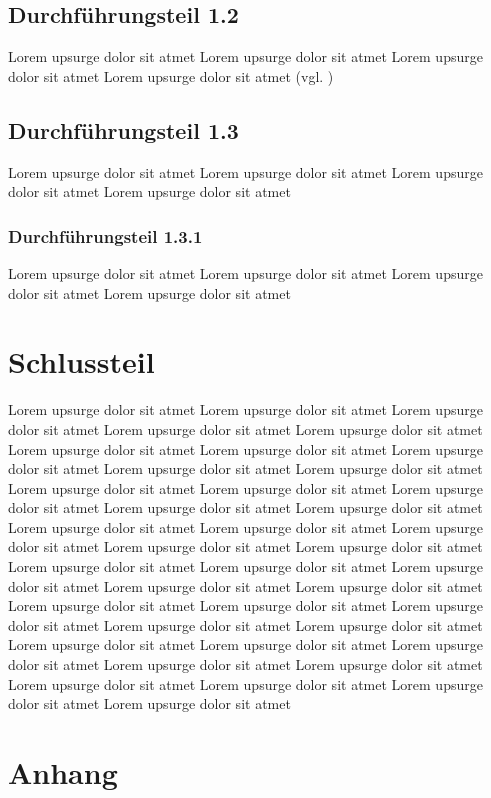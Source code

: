 \documentclass[12pt, a4paper]{article}
\begin{document}
\subsection{Durchführungsteil 1.2}
Lorem upsurge dolor sit atmet Lorem upsurge dolor sit atmet Lorem upsurge dolor sit atmet Lorem upsurge dolor sit atmet (vgl. \cite{samplebook})
\subsection{Durchführungsteil 1.3}
Lorem upsurge dolor sit atmet Lorem upsurge dolor sit atmet Lorem upsurge dolor sit atmet Lorem upsurge dolor sit atmet
\subsubsection{Durchführungsteil 1.3.1}
Lorem upsurge dolor sit atmet Lorem upsurge dolor sit atmet Lorem upsurge dolor sit atmet Lorem upsurge dolor sit atmet

\section{Schlussteil}

Lorem upsurge dolor sit atmet Lorem upsurge dolor sit atmet Lorem upsurge dolor sit atmet Lorem upsurge dolor sit atmet Lorem upsurge dolor sit atmet Lorem upsurge dolor sit atmet Lorem upsurge dolor sit atmet Lorem upsurge dolor sit atmet Lorem upsurge dolor sit atmet Lorem upsurge dolor sit atmet Lorem upsurge dolor sit atmet Lorem upsurge dolor sit atmet Lorem upsurge dolor sit atmet Lorem upsurge dolor sit atmet Lorem upsurge dolor sit atmet Lorem upsurge dolor sit atmet Lorem upsurge dolor sit atmet Lorem upsurge dolor sit atmet Lorem upsurge dolor sit atmet Lorem upsurge dolor sit atmet Lorem upsurge dolor sit atmet Lorem upsurge dolor sit atmet Lorem upsurge dolor sit atmet Lorem upsurge dolor sit atmet Lorem upsurge dolor sit atmet Lorem upsurge dolor sit atmet Lorem upsurge dolor sit atmet Lorem upsurge dolor sit atmet Lorem upsurge dolor sit atmet Lorem upsurge dolor sit atmet Lorem upsurge dolor sit atmet Lorem upsurge dolor sit atmet Lorem upsurge dolor sit atmet Lorem upsurge dolor sit atmet Lorem upsurge dolor sit atmet Lorem upsurge dolor sit atmet Lorem upsurge dolor sit atmet Lorem upsurge dolor sit atmet Lorem upsurge dolor sit atmet

\clearpage
{}
\printbibliography
\newpage
{}
\section{Anhang}
\end{document}
